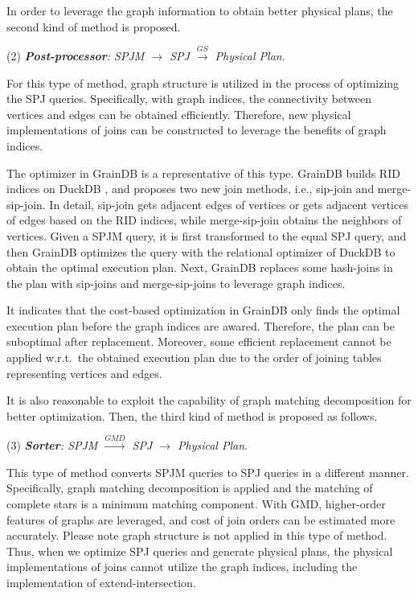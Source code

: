 In order to leverage the graph information to obtain better physical plans, the second kind of method is proposed.

(2) \emph{\textbf{Post-processor}: SPJM $\rightarrow$ SPJ $\xrightarrow{GS}$ Physical Plan}.

For this type of method, graph structure is utilized in the process of optimizing the SPJ queries.
Specifically, with graph indices, the connectivity between vertices and edges can be obtained efficiently.
Therefore, new physical implementations of joins can be constructed to leverage the benefits of graph indices.

The optimizer in GrainDB is a representative of this type.
GrainDB builds RID indices on DuckDB \cite{duckdb}, and proposes two new join methods, i.e., sip-join and merge-sip-join.
In detail, sip-join gets adjacent edges of vertices or gets adjacent vertices of edges based on the RID indices, while merge-sip-join obtains the neighbors of vertices.
Given a SPJM query, it is first transformed to the equal SPJ query, and then GrainDB optimizes the query with the relational optimizer of DuckDB to obtain the optimal execution plan.
Next, GrainDB replaces some hash-joins in the plan with sip-joins and merge-sip-joins to leverage graph indices.

It indicates that the cost-based optimization in GrainDB only finds the optimal execution plan before the graph indices are awared.
Therefore, the plan can be suboptimal after replacement.
Moreover, some efficient replacement cannot be applied w.r.t.~the obtained execution plan due to the order of joining tables representing vertices and edges.


It is also reasonable to exploit the capability of graph matching decomposition for better optimization.
Then, the third kind of method is proposed as follows.

(3) \emph{\textbf{Sorter}: SPJM $\xrightarrow{GMD}$ SPJ $\rightarrow$ Physical Plan}.

This type of method converts SPJM queries to SPJ queries in a different manner.
Specifically, graph matching decomposition is applied and the matching of complete stars is a minimum matching component.
With GMD, higher-order features of graphs are leveraged, and cost of join orders can be estimated more accurately.
Please note graph structure is not applied in this type of method.
Thus, when we optimize SPJ queries and generate physical plans, the physical implementations of joins cannot utilize the graph indices, including the implementation of extend-intersection.


